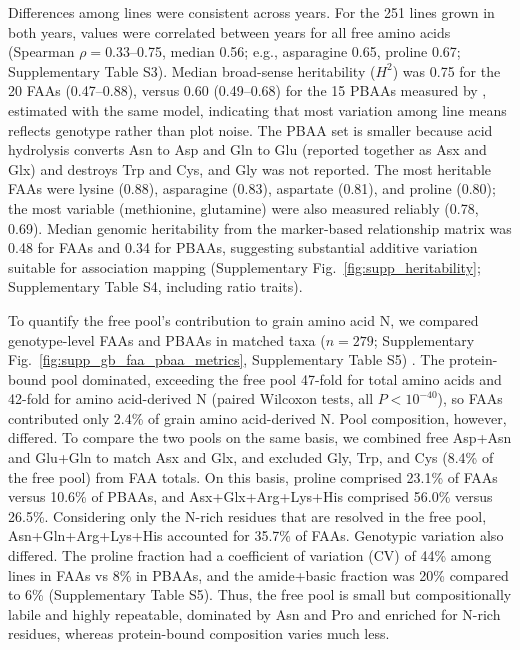 Differences among lines were consistent across years. For the 251 lines grown in both years, values were correlated between years for all free amino acids (Spearman $\rho = 0.33$--0.75, median 0.56; e.g., asparagine 0.65, proline 0.67; Supplementary Table S3). Median broad-sense heritability ($H^2$) was 0.75 for the 20 FAAs (0.47--0.88), versus 0.60 (0.49--0.68) for the 15 PBAAs measured by \citet{Shrestha2022}, estimated with the same model, indicating that most variation among line means reflects genotype rather than plot noise. The PBAA set is smaller because acid hydrolysis converts Asn to Asp and Gln to Glu (reported together as Asx and Glx) and destroys Trp and Cys, and Gly was not reported. The most heritable FAAs were lysine (0.88), asparagine (0.83), aspartate (0.81), and proline (0.80); the most variable (methionine, glutamine) were also measured reliably (0.78, 0.69). Median genomic heritability from the marker-based relationship matrix was 0.48 for FAAs and 0.34 for PBAAs, suggesting substantial additive variation suitable for association mapping (Supplementary Fig.~\ref{fig:supp_heritability}; Supplementary Table S4, including ratio traits).

To quantify the free pool's contribution to grain amino acid N, we compared genotype-level FAAs and PBAAs in matched taxa ($n = 279$; Supplementary Fig.~\ref{fig:supp_gb_faa_pbaa_metrics}, Supplementary Table S5) \citep{Shrestha2022}. The protein-bound pool dominated, exceeding the free pool 47-fold for total amino acids and 42-fold for amino acid-derived N (paired Wilcoxon tests, all $P < 10^{-40}$), so FAAs contributed only 2.4\% of grain amino acid-derived N. Pool composition, however, differed. To compare the two pools on the same basis, we combined free Asp+Asn and Glu+Gln to match Asx and Glx, and excluded Gly, Trp, and Cys (8.4\% of the free pool) from FAA totals. On this basis, proline comprised 23.1\% of FAAs versus 10.6\% of PBAAs, and Asx+Glx+Arg+Lys+His comprised 56.0\% versus 26.5\%. Considering only the N-rich residues that are resolved in the free pool, Asn+Gln+Arg+Lys+His accounted for 35.7\% of FAAs. Genotypic variation also differed. The proline fraction had a coefficient of variation (CV) of 44\% among lines in FAAs vs 8\% in PBAAs, and the amide+basic fraction was 20\% compared to 6\% (Supplementary Table S5). Thus, the free pool is small but compositionally labile and highly repeatable, dominated by Asn and Pro and enriched for N-rich residues, whereas protein-bound composition varies much less.


